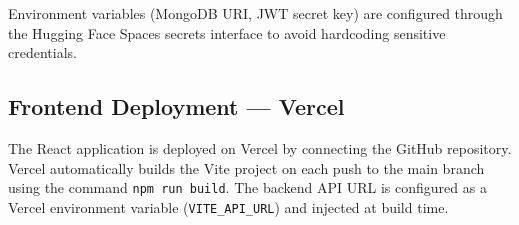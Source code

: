 Environment variables (MongoDB URI, JWT secret key) are configured through
the Hugging Face Spaces secrets interface to avoid hardcoding sensitive
credentials.

\subsection{Frontend Deployment — Vercel}

The React application is deployed on Vercel by connecting the GitHub
repository. Vercel automatically builds the Vite project on each push to the
main branch using the command \texttt{npm run build}. The backend API URL is
configured as a Vercel environment variable (\texttt{VITE\_API\_URL}) and
injected at build time.
